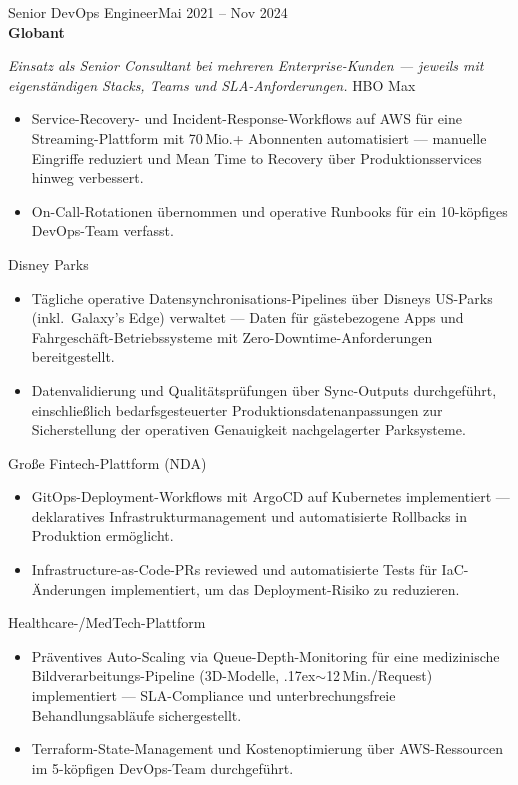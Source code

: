 \documentclass[a4paper,9pt]{extarticle}
\newcommand{\jobentry}[4]{%
  {\mediumfont\color{darktext}#1}\hfill{\small\color{graytext}#4}\\
  {\color{accent}\textbf{#2}}\enspace{\small\color{graytext}| #3}\par\vspace{0.2em}
}
\begin{document}
\jobentry{Senior DevOps Engineer}{Globant}{Bogot\'{a}, Kolumbien}{Mai 2021 -- Nov 2024}
{\small\color{graytext}\textit{Einsatz als Senior Consultant bei mehreren Enterprise-Kunden --- jeweils mit eigenst\"andigen Stacks, Teams und SLA-Anforderungen.}}
\vspace{0.2em}
{\small\mediumfont\color{accent}HBO Max}
\begin{itemize}
  \item Service-Recovery- und Incident-Response-Workflows auf AWS f\"ur eine Streaming-Plattform mit 70\,Mio.+ Abonnenten automatisiert --- manuelle Eingriffe reduziert und Mean Time to Recovery \"uber Produktionsservices hinweg verbessert.
  \item On-Call-Rotationen \"ubernommen und operative Runbooks f\"ur ein 10-k\"opfiges DevOps-Team verfasst.
\end{itemize}

\vspace{0.15em}
{\small\mediumfont\color{accent}Disney Parks}
\begin{itemize}
  \item T\"agliche operative Datensynchronisations-Pipelines \"uber Disneys US-Parks (inkl.\ Galaxy's Edge) verwaltet --- Daten f\"ur g\"astebezogene Apps und Fahrgesch\"aft-Betriebssysteme mit Zero-Downtime-Anforderungen bereitgestellt.
  \item Datenvalidierung und Qualit\"atspr\"ufungen \"uber Sync-Outputs durchgef\"uhrt, einschlie\ss lich bedarfsgesteuerter Produktionsdatenanpassungen zur Sicherstellung der operativen Genauigkeit nachgelagerter Parksysteme.
\end{itemize}

\vspace{0.15em}
{\small\mediumfont\color{accent}Gro\ss e Fintech-Plattform (NDA)}
\begin{itemize}
  \item GitOps-Deployment-Workflows mit ArgoCD auf Kubernetes implementiert --- deklaratives Infrastrukturmanagement und automatisierte Rollbacks in Produktion erm\"oglicht.
  \item Infrastructure-as-Code-PRs reviewed und automatisierte Tests f\"ur IaC-\"Anderungen implementiert, um das Deployment-Risiko zu reduzieren.
\end{itemize}

\vspace{0.15em}
{\small\mediumfont\color{accent}Healthcare-/MedTech-Plattform}
\begin{itemize}
  \item Pr\"aventives Auto-Scaling via Queue-Depth-Monitoring f\"ur eine medizinische Bildverarbeitungs-Pipeline (3D-Modelle, \raise.17ex\hbox{$\scriptstyle\sim$}12\,Min./Request) implementiert --- SLA-Compliance und unterbrechungsfreie Behandlungsabl\"aufe sichergestellt.
  \item Terraform-State-Management und Kostenoptimierung \"uber AWS-Ressourcen im 5-k\"opfigen DevOps-Team durchgef\"uhrt.
\end{itemize}
\end{document}
